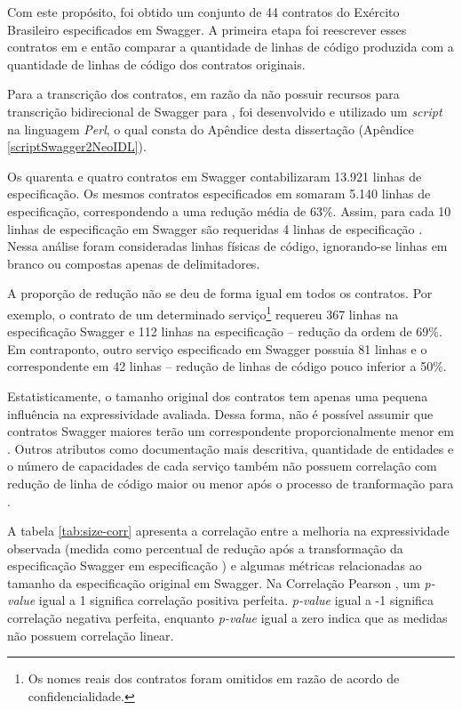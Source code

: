 Com este propósito, foi obtido um conjunto de 44 contratos do Exército
Brasileiro especificados em Swagger. A primeira etapa foi reescrever esses
contratos em \neoidl{} e então comparar a quantidade de linhas de código
produzida com a quantidade de linhas de código dos contratos originais.

Para a
transcrição dos contratos, em razão da \neoidl{} não possuir recursos para
transcrição bidirecional de Swagger para \neoidl{}, foi desenvolvido
e utilizado um \textit{script} na linguagem \textit{Perl}, 
o qual consta do Apêndice desta dissertação
(Apêndice \ref{scriptSwagger2NeoIDL}).

Os quarenta e quatro contratos em Swagger contabilizaram 13.921 linhas de
especificação. Os mesmos contratos especificados em \neoidl{} somaram 5.140
linhas de especificação, correspondendo a uma redução média de 63\%. Assim, para
cada 10 linhas de especificação em Swagger são requeridas 4 linhas de
especificação \neoidl{}. Nessa análise foram consideradas linhas físicas de
código, ignorando-se linhas em branco ou compostas apenas de delimitadores.

A proporção de redução não se deu de forma igual em todos os contratos. Por
exemplo, o contrato de um determinado serviço\footnote{Os nomes reais dos
contratos foram omitidos em razão de acordo de confidencialidade.} requereu 367
linhas na especificação Swagger e 112 linhas na especificação \neoidl{} --
redução da ordem de 69\%.
Em contraponto, outro serviço especificado em Swagger possuia 81 linhas e o
correspondente em \neoidl{} 42 linhas -- redução de linhas de código pouco inferior a 50\%.

Estatisticamente, o tamanho original dos contratos tem apenas uma pequena
influência na expressividade avaliada. Dessa forma, não é possível assumir que
contratos Swagger maiores terão um correspondente proporcionalmente menor em
\neoidl{}.
Outros atributos como documentação mais descritiva, quantidade de entidades e o
número de capacidades de cada serviço também não possuem correlação com redução
de linha de código maior ou menor após o processo de tranformação para
\neoidl{}.

A tabela \ref{tab:size-corr} apresenta a correlação entre a
melhoria na expressividade observada (medida como percentual de redução após a
transformação da especificação Swagger em especificação \neoidl{}) e algumas
métricas relacionadas ao tamanho da especificação original em Swagger. Na
Correlação Pearson \cite{benesty2009pearson}, um \emph{p-value} igual a 1 significa correlação
positiva perfeita. \emph{p-value} igual a -1 significa correlação negativa
perfeita, enquanto \emph{p-value} igual a zero indica que as medidas não possuem
correlação linear.

